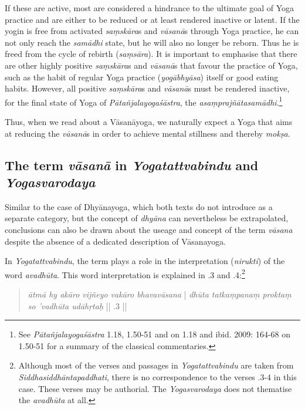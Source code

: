 If these are active, most are considered a hindrance to the ultimate goal of Yoga practice and are either to be reduced or at least rendered inactive or latent. If the yogin is free from activated \textit{saṃskāra}s and \textit{vāsanā}s through Yoga practice, he can not only reach the \textit{samādhi} state, but he will also no longer be reborn. Thus he is freed from the cycle of rebirth (\textit{saṃsāra}). It is important to emphasise that there are other highly positive \textit{saṃskāra}s and \textit{vāsanā}s that favour the practice of Yoga, such as the habit of regular Yoga practice (\textit{yogābhyāsa}) itself or good eating habits. However, all positive \textit{saṃskāra}s and \textit{vāsanā}s must be rendered inactive, for the final state of Yoga of \textit{Pātañjalayogaśāstra}, the \textit{asaṃprajñātasamādhi}.\footnote{See \textit{Pātañjalayogaśāstra} 1.18, 1.50-51 and \citeauthor[2009: 70-72]{bryant2009} on 1.18 and ibid. 2009: 164-68 on 1.50-51 for a summary of the classical commentaries.}  

Thus, when we read about a Vāsanāyoga, we naturally expect a Yoga that aims at reducing the \textit{vāsanā}s in order to achieve mental stillness and thereby \textit{mokṣa}.

\subsection{The term \textit{vāsanā} in \textit{Yogatattvabindu} and \textit{Yogasvarodaya}}

Similar to the case of Dhyānayoga, which both texts do not introduce as a separate category, but the concept of \textit{dhyāna} can nevertheless be extrapolated, conclusions can also be drawn about the useage and concept of the term \textit{vāsana} despite the absence of a dedicated description of Vāsanayoga.

In \textit{Yogatattvabindu}, the term plays a role in the interpretation (\textit{nirukti}) of the word \textit{avadhūta}. This word interpretation is explained in .3 and .4:\footnote{Although most of the verses and passages in \textit{Yogatattvabindu}  are taken from \textit{Siddhasiddhāntapaddhati}, there is no correspondence to the verses .3-4 in this case. These verses may be authorial. The \textit{Yogasvarodaya} does not thematise the \textit{avadhūta} at all.}

\begin{quote}
  \textit{ātmā hy akāro vijñeyo vakāro bhavavāsana} |
  \textit{dhūta tatkaṃpanaṃ proktaṃ so 'vadhūta udāhṛtaḥ} || .3 ||
\end{quote}

